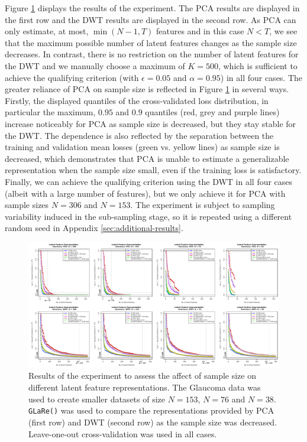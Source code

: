 Figure \ref{fig:eye-sample-size-results-results-01} displays the results of the experiment.
The PCA results are displayed in the first row and the DWT results are displayed in the second row.
As PCA can only estimate, at most, $\min(N-1, T)$ features and in this case $N<T$, we see that the maximum possible number of latent features changes as the sample size decreases.
In contrast, there is no restriction on the number of latent features for the DWT and we manually choose a maximum of $K=500$, which is sufficient to achieve the qualifying criterion (with $\epsilon=0.05$ and $\alpha=0.95$) in all four cases.
The greater reliance of PCA on sample size is reflected in Figure \ref{fig:eye-sample-size-results-results-01} in several ways.
Firstly, the displayed quantiles of the cross-validated loss distribution, in particular the maximum, $0.95$ and $0.9$ quantiles (red, grey and purple lines) increase noticeably for PCA as sample size is decreased, but they stay stable for the DWT.
The dependence is also reflected by the separation between the training and validation mean losses (green vs. yellow lines) as sample size is decreased, which demonstrates that PCA is unable to estimate a generalizable representation when the sample size small, even if the training loss is satisfactory.
Finally, we can achieve the qualifying criterion using the DWT in all four cases (albeit with a large number of features), but we only achieve it for PCA with sample sizes $N=306$ and $N=153$.
The experiment is subject to sampling variability induced in the sub-sampling stage, so it is repeated using a different random seed in Appendix \ref{sec:additional-results}.

\begin{figure}
    \centering
    \includegraphics[width=1\linewidth]{figures/eye-sample-size-results-results-01.pdf}
    \caption{Results of the experiment to assess the affect of sample size on different latent feature representations. The Glaucoma data was used to create smaller datasets of size $N=153$, $N=76$ and $N=38$. \texttt{GLaRe()} was used to compare the representations provided by PCA (first row) and DWT (second row) as the sample size was decreased. Leave-one-out cross-validation was used in all cases.}
    \label{fig:eye-sample-size-results-results-01}
\end{figure}


